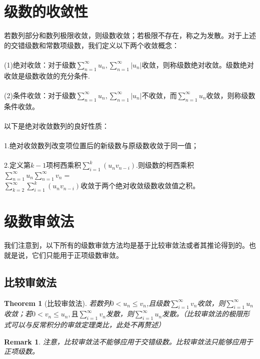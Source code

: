 \documentclass[12pt,a4paper,UTF8]{ctexbook}
\theoremstyle{plain}
\newtheorem{theorem}{\indent Theorem}[section]
\newtheorem{remark}{\indent Remark}[section]
\begin{document}
\section{级数的收敛性}
若数列部分和数列极限收敛，则级数收敛；若极限不存在，称之为发散。对于上述的交错级数和常数项级数，我们定义以下两个收敛概念：
\paragraph{}(1)绝对收敛：对于级数$\sum_{n=1}^\infty u_n,\sum_{n=1}^\infty|u_n|$收敛，则称级数绝对收敛。级数绝对收敛是级数收敛的充分条件.
\paragraph{}(2)条件收敛：对于级数$\sum_{n=1}^\infty u_n,\sum_{n=1}^\infty|u_n|$不收敛，而$\sum_{n=1}^\infty u_n$收敛，则称级数条件收敛。
\paragraph{}以下是绝对收敛数列的良好性质：
\paragraph{}1.绝对收敛数列改变项位置后的新级数与原级数收敛于同一值；
\paragraph{}2.定义第$k-1$项柯西乘积$\sum_{i=1}^k(u_nv_{n-i})$.则级数的柯西乘积
$\sum_{n=1}^\infty u_n\sum_{n=1}^\infty v_n=$\\ $\sum_{k=2}^\infty\sum_{i=1}^k(u_nv_{n-i})$收敛于两个绝对收敛级数收敛值之积。
\section{级数审敛法}
我们注意到，以下所有的级数审敛方法均是基于比较审敛法或者其推论得到的。也就是说，它们只能用于正项级数审敛。
\subsection{比较审敛法}
\begin{theorem}[比较审敛法]
若数列$0<u_n\leq v_n$,且级数$\sum_{i=1}^\infty v_n$收敛，则$\sum_{i=1}^\infty u_n$收敛；若$0<v_n\leq u_n,且\sum_{i=1}^\infty v_n$发散，则$\sum_{i=1}^\infty u_n$发散。（比较审敛法的极限形式可以与反常积分的审敛定理类比，此处不再赘述）
\end{theorem}
\begin{remark}
注意，比较审敛法不能够应用于交错级数。比较审敛法只能够应用于正项级数。
\end{remark}
\end{document}
